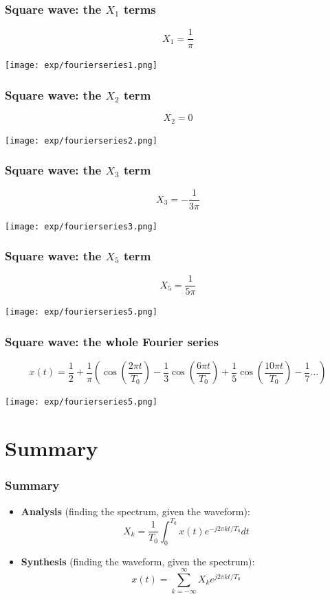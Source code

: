 \documentclass{beamer}
\begin{document}
\begin{frame}
  \frametitle{Square wave: the $X_1$ terms}
  \[
  X_1 = \frac{1}{\pi}
  \]
  \centerline{\texttt{[image: exp/fourierseries1.png]}}
\end{frame}

\begin{frame}
  \frametitle{Square wave: the $X_2$ term}
    \[
    X_2 = 0
    \]
  \centerline{\texttt{[image: exp/fourierseries2.png]}}
\end{frame}

\begin{frame}
  \frametitle{Square wave: the $X_3$ term}
    \[
    X_3 = -\frac{1}{3\pi}
    \]
  \centerline{\texttt{[image: exp/fourierseries3.png]}}
\end{frame}

\begin{frame}
  \frametitle{Square wave: the $X_5$ term}
    \[
    X_5 = \frac{1}{5\pi}
    \]
  \centerline{\texttt{[image: exp/fourierseries5.png]}}
\end{frame}

\begin{frame}
  \frametitle{Square wave: the whole Fourier series}
    \[
    x(t) = \frac{1}{2} + \frac{1}{\pi}\left(\cos\left(\frac{2\pi t}{T_0}\right)-\frac{1}{3}\cos\left(\frac{6\pi t}{T_0}\right)+\frac{1}{5}\cos\left(\frac{10\pi t}{T_0}\right)-\frac{1}{7}\ldots\right)
    \]
  \centerline{\texttt{[image: exp/fourierseries5.png]}}
\end{frame}

\section[Summary]{Summary}
\setcounter{subsection}{1}

\begin{frame}
  \frametitle{Summary}
  \begin{itemize}
  \item {\bf Analysis}  (finding the spectrum, given the waveform):
    \[
    X_k = \frac{1}{T_0}\int_0^{T_0} x(t)e^{-j2\pi kt/T_0}dt
    \]
  \item {\bf Synthesis}  (finding the waveform, given the spectrum):
    \[
    x(t) = \sum_{k=-\infty}^\infty X_k e^{j2\pi kt/T_0}
    \]
  \end{itemize}
\end{frame}  
        
\end{document}
